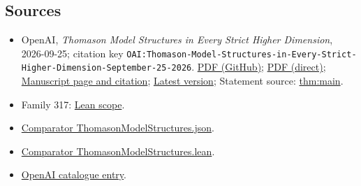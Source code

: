 \documentclass[11pt]{article}
\begin{document}
\subsection{Sources}
\begin{itemize}
\item OpenAI, \emph{Thomason Model Structures in Every Strict Higher Dimension}, 2026-09-25; citation key \texttt{OAI:Thomason-Model-Structures-in-Every-Strict-Higher-Dimension-September-25-2026}. \href{https://github.com/openai/math/blob/adc7f1241b42e322a6451854ab7e4b4c146bf78a/preprints/Thomason-Model-Structures-in-Every-Strict-Higher-Dimension-September-25-2026/paper.pdf}{PDF (GitHub)}; \href{https://github.com/openai/math/raw/adc7f1241b42e322a6451854ab7e4b4c146bf78a/preprints/Thomason-Model-Structures-in-Every-Strict-Higher-Dimension-September-25-2026/paper.pdf}{PDF (direct)}; \href{https://github.com/openai/math/blob/adc7f1241b42e322a6451854ab7e4b4c146bf78a/preprints/Thomason-Model-Structures-in-Every-Strict-Higher-Dimension-September-25-2026/README.md}{Manuscript page and citation}; \href{https://github.com/openai/math/blob/main/preprints/Thomason-Model-Structures-in-Every-Strict-Higher-Dimension-September-25-2026/paper.pdf}{Latest version}; Statement source: \href{https://github.com/openai/math/blob/adc7f1241b42e322a6451854ab7e4b4c146bf78a/preprints/Thomason-Model-Structures-in-Every-Strict-Higher-Dimension-September-25-2026/build/sections/01-introduction.tex\#L41}{thm:main}.
\item Family 317: \href{https://github.com/openai/math/blob/adc7f1241b42e322a6451854ab7e4b4c146bf78a/lean/docs/317.md}{Lean scope}.
\item \href{https://github.com/openai/math/blob/adc7f1241b42e322a6451854ab7e4b4c146bf78a/lean/ComparatorChallenges/ThomasonModelStructures.json}{Comparator ThomasonModelStructures.json}.
\item \href{https://github.com/openai/math/blob/adc7f1241b42e322a6451854ab7e4b4c146bf78a/lean/ComparatorChallenges/ThomasonModelStructures.lean}{Comparator ThomasonModelStructures.lean}.
\item \href{https://github.com/openai/math/blob/adc7f1241b42e322a6451854ab7e4b4c146bf78a/CONTENTS.md}{OpenAI catalogue entry}.
\end{itemize}
\end{document}
